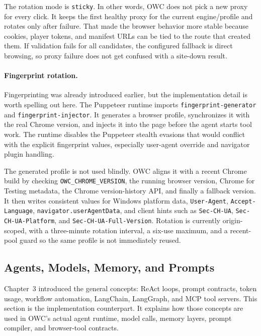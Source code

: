 The rotation mode is \texttt{sticky}. In other words, OWC does not pick a new proxy for
every click. It keeps the first healthy proxy for the current engine/profile and rotates
only after failure. That made the browser behavior more stable because cookies, player
tokens, and manifest URLs can be tied to the route that created them. If validation
fails for all candidates, the configured fallback is direct browsing, so proxy failure
does not get confused with a site-down result.

\paragraph{Fingerprint rotation.}
Fingerprinting was already introduced earlier, but the implementation detail is worth
spelling out here. The Puppeteer runtime imports \texttt{fingerprint-generator} and
\texttt{fingerprint-injector}. It generates a browser profile, synchronizes it with the
real Chrome version, and injects it into the page before the agent starts tool work. The
runtime disables the Puppeteer stealth evasions that would conflict with the explicit
fingerprint values, especially user-agent override and navigator plugin handling.

The generated profile is not used blindly. OWC aligns it with a recent Chrome build by
checking \texttt{OWC\_CHROME\_VERSION}, the running browser version, Chrome for Testing
metadata, the Chrome version-history API, and finally a fallback version. It then writes
consistent values for Windows platform data, \texttt{User-Agent},
\texttt{Accept-Language}, \texttt{navigator.userAgentData}, and client hints such as
\texttt{Sec-CH-UA}, \texttt{Sec-CH-UA-Platform}, and
\texttt{Sec-CH-UA-Full-Version}. Rotation is currently origin-scoped, with a
three-minute rotation interval, a six-use maximum, and a recent-pool guard so the same
profile is not immediately reused.



\subsection{Agents, Models, Memory, and Prompts}

Chapter~3 introduced the general concepts: ReAct loops, prompt contracts, token usage,
workflow automation, LangChain, LangGraph, and MCP tool servers. This section is the
implementation counterpart. It explains how those concepts are used in OWC's actual
agent runtime, model calls, memory layers, prompt compiler, and browser-tool contracts.

